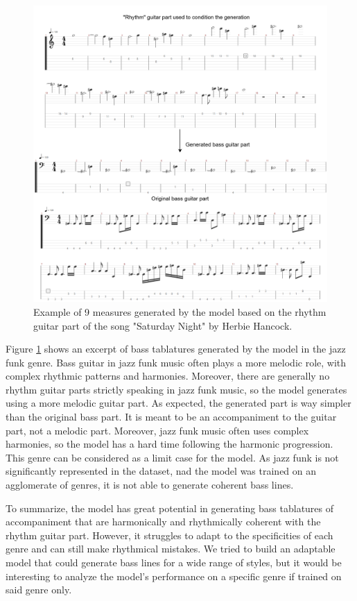
\begin{figure}[!ht]
    \centering
    \includegraphics[width=0.9\linewidth]{../images-figures/gen_herbie_hancock.png}
    \caption{Example of 9 measures generated by the model based on the rhythm guitar part of the song "Saturday Night" by Herbie Hancock.}
    \label{fig:gen_herbie_hancock}
\end{figure}

Figure \ref{fig:gen_herbie_hancock} shows an excerpt of bass tablatures generated by the model in the jazz funk genre.
Bass guitar in jazz funk music often plays a more melodic role, with complex rhythmic patterns and harmonies.
Moreover, there are generally no rhythm guitar parts strictly speaking in jazz funk music, so the model generates using a more melodic guitar part.
As expected, the generated part is way simpler than the original bass part.
It is meant to be an accompaniment to the guitar part, not a melodic part.
Moreover, jazz funk music often uses complex harmonies, so the model has a hard time following the harmonic progression.
This genre can be considered as a limit case for the model.
As jazz funk is not significantly represented in the dataset, nad the model was trained on an agglomerate of genres, it is not able to generate coherent bass lines.

To summarize, the model has great potential in generating bass tablatures of accompaniment that are harmonically and rhythmically coherent with the rhythm guitar part.
However, it struggles to adapt to the specificities of each genre and can still make rhythmical mistakes.
We tried to build an adaptable model that could generate bass lines for a wide range of styles,
but it would be interesting to analyze the model's performance on a specific genre if trained on said genre only.

